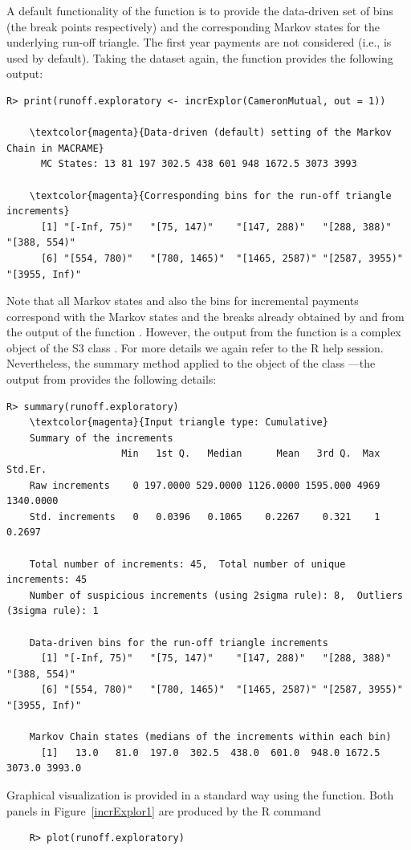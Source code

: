 A default functionality of the  function is to provide the data-driven set of bins (the break points respectively) and the corresponding Markov states for the underlying run-off triangle. The first year payments are not considered (i.e.,  is used by default). Taking the  dataset again, the function provides the following output: 
\begin{Verbatim}[commandchars=\\\{\}]
    R> print(runoff.exploratory <- incrExplor(CameronMutual, out = 1))

    \textcolor{magenta}{Data-driven (default) setting of the Markov Chain in MACRAME}
      MC States: 13 81 197 302.5 438 601 948 1672.5 3073 3993

    \textcolor{magenta}{Corresponding bins for the run-off triangle increments}
      [1] "[-Inf, 75)"   "[75, 147)"    "[147, 288)"   "[288, 388)"   "[388, 554)"   
      [6] "[554, 780)"   "[780, 1465)"  "[1465, 2587)" "[2587, 3955)" "[3955, Inf)"  
\end{Verbatim}
Note that all Markov states and also the bins for incremental payments correspond  with the Markov states and the breaks already obtained by  and  from the output of the function . However, the output from the  function is a complex object of the S3 class . For more details we again refer to the R help session. 
Nevertheless, the summary method applied to the object of the class ---the output from  provides the following details: 
\begin{Verbatim}[commandchars=\\\{\}]
    R> summary(runoff.exploratory)
    \textcolor{magenta}{Input triangle type: Cumulative}
    Summary of the increments
                    Min   1st Q.   Median      Mean   3rd Q.  Max   Std.Er.
    Raw increments    0 197.0000 529.0000 1126.0000 1595.000 4969 1340.0000
    Std. increments   0   0.0396   0.1065    0.2267    0.321    1    0.2697

    Total number of increments: 45,  Total number of unique increments: 45
    Number of suspicious increments (using 2sigma rule): 8,  Outliers (3sigma rule): 1

    Data-driven bins for the run-off triangle increments
      [1] "[-Inf, 75)"   "[75, 147)"    "[147, 288)"   "[288, 388)"   "[388, 554)"   
      [6] "[554, 780)"   "[780, 1465)"  "[1465, 2587)" "[2587, 3955)" "[3955, Inf)" 

    Markov Chain states (medians of the increments within each bin)
      [1]   13.0   81.0  197.0  302.5  438.0  601.0  948.0 1672.5 3073.0 3993.0
\end{Verbatim}
Graphical visualization is provided in a standard way using the   function. Both panels in Figure~\ref{incrExplor1} are produced by the R command
\begin{verbatim}
    R> plot(runoff.exploratory)
\end{verbatim}

